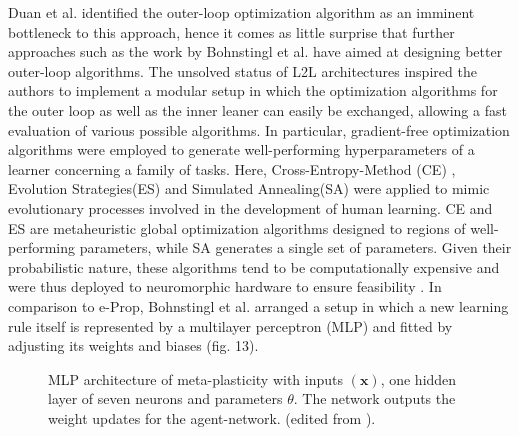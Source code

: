 \documentclass[letterpaper, 10 pt, conference]{ieeeconf}  %
\begin{document}
Duan et al.\cite{duanOneShotImitationLearning2017} identified the outer-loop optimization algorithm as an imminent 
bottleneck to this approach, hence it comes as 
little surprise that further approaches such as the work by Bohnstingl et al.\cite{bohnstinglNeuromorphicHardwareLearns2019}
 have aimed at designing better outer-loop algorithms.
The unsolved status of L2L architectures inspired the authors to implement a modular setup in which the optimization algorithms
for the outer loop as well as the inner leaner can easily be exchanged, allowing a fast evaluation of various possible algorithms. In 
particular, gradient-free optimization algorithms were employed to generate well-performing hyperparameters of a learner concerning a 
family of tasks. Here, Cross-Entropy-Method (CE) \cite{botevCrossEntropyMethodOptimization2013}, Evolution Strategies(ES)
\cite{beyerEvolutionStrategiesComprehensive2002} and Simulated Annealing(SA)\cite{kirkpatrickOptimizationSimulatedAnnealing1983}
were applied to mimic evolutionary 
processes involved in the development of human learning. CE and ES are metaheuristic global optimization algorithms designed to regions of 
well-performing parameters, while SA generates a single set of parameters. Given their probabilistic nature, these algorithms tend to be 
computationally expensive and were thus deployed to neuromorphic hardware to ensure feasibility \cite{bohnstinglNeuromorphicHardwareLearns2019}.
In comparison to e-Prop, 
Bohnstingl et al. arranged a setup in which a new learning rule itself is represented by a multilayer perceptron (MLP) and fitted by 
adjusting its weights and biases (fig. 13). 

\begin{figure}[thpb]
        \centering
  \caption{ MLP architecture of meta-plasticity with inputs $\mathbf{(x)}$, one hidden layer of seven neurons and parameters $\theta$. 
  The network outputs the weight updates for the agent-network.
  (edited from \cite{bohnstinglNeuromorphicHardwareLearns2019}).
  }
        \label{figurelabel}
     \end{figure}
\end{document}
